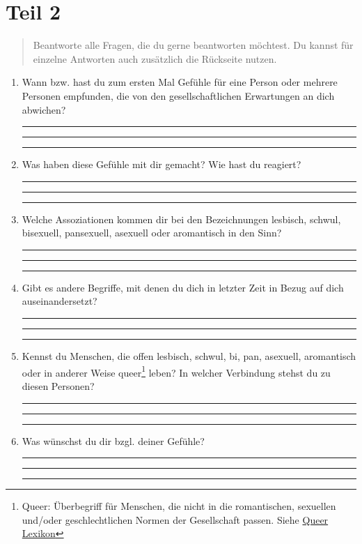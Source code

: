 \documentclass[a4paper,12pt]{article}
\begin{document}
\clearpage

\section*{Teil 2}

\begin{quote}
Beantworte alle Fragen, die du gerne beantworten möchtest. Du kannst für einzelne Antworten auch zusätzlich die Rückseite nutzen.
\end{quote}

\begin{enumerate}[label=--]
    \item Wann bzw. hast du zum ersten Mal Gefühle für eine Person oder mehrere Personen empfunden, die von den gesellschaftlichen Erwartungen an dich abwichen?  

    \rule{12cm}{0.2pt}

    \rule{12cm}{0.2pt}

    \rule{12cm}{0.2pt}
    
    \item Was haben diese Gefühle mit dir gemacht? Wie hast du reagiert?  

    \rule{12cm}{0.2pt}

    \rule{12cm}{0.2pt}
    
    \rule{12cm}{0.2pt}
    
    \item Welche Assoziationen kommen dir bei den Bezeichnungen lesbisch, schwul, bisexuell, pansexuell, asexuell oder aromantisch in den Sinn?  

    \rule{12cm}{0.2pt}

    \rule{12cm}{0.2pt}
    
    \rule{12cm}{0.2pt}
    
    \item Gibt es andere Begriffe, mit denen du dich in letzter Zeit in Bezug auf dich auseinandersetzt?  

    \rule{12cm}{0.2pt}

    \rule{12cm}{0.2pt}
    
    \rule{12cm}{0.2pt}
    
    \item Kennst du Menschen, die offen lesbisch, schwul, bi, pan, asexuell, aromantisch oder in anderer Weise queer\footnote{Queer: Überbegriff für Menschen, die nicht in die romantischen, sexuellen und/oder geschlechtlichen Normen der Gesellschaft passen. Siehe \href{https://queer-lexikon.net/2017/06/08/queer/}{Queer Lexikon}} leben? In welcher Verbindung stehst du zu diesen Personen?  

    \rule{12cm}{0.2pt}

    \rule{12cm}{0.2pt}
    
    \rule{12cm}{0.2pt}
    
    \item Was wünschst du dir bzgl. deiner Gefühle?  

    \rule{12cm}{0.2pt}

    \rule{12cm}{0.2pt}
    
    \rule{12cm}{0.2pt}
\end{enumerate}
\end{document}
